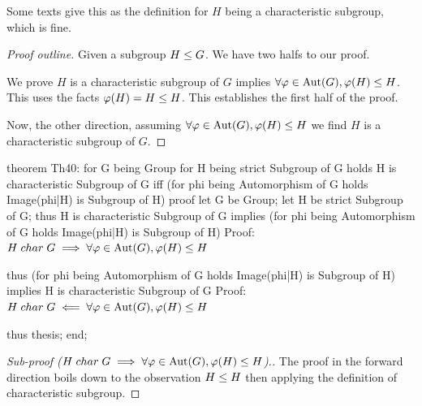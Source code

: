 Some texts give this as the definition for $H$ being a characteristic
subgroup, which is fine.

\begin{proof}[Proof outline]
  Given a subgroup $H\leq G$. We have two halfs to our proof.

We prove $H$ is a characteristic subgroup of $G$ implies
$\forall\varphi\in\operatorname{Aut}(G),\varphi(H)\leq H$. This uses the facts
$\varphi(H)=H\leq H$. This establishes the first half of the proof.

Now, the other direction, assuming
$\forall\varphi\in\operatorname{Aut}(G),\varphi(H)\leq H$ we find $H$ is a
characteristic subgroup of $G$.
\end{proof}

\nwenddocs{}\endmoddef\nwstartdeflinemarkup{}\nwenddeflinemarkup
theorem Th40:
  for G being Group
  for H being strict Subgroup of G
  holds H is characteristic Subgroup of G iff
  (for phi being Automorphism of G holds Image(phi|H) is Subgroup of H)
proof
  let G be Group;
  let H be strict Subgroup of G;
  thus H is characteristic Subgroup of G implies
       (for phi being Automorphism of G holds Image(phi|H) is Subgroup of H)
  \LA{}Proof: $H\mathrel{char} G\implies\forall\varphi\in\operatorname{Aut}(G),\varphi(H)\leq H$~{\nwtagstyle{}}\RA{}

  thus (for phi being Automorphism of G holds Image(phi|H) is Subgroup of H)
       implies H is characteristic Subgroup of G
  \LA{}Proof: $H\mathrel{char} G\impliedby\forall\varphi\in\operatorname{Aut}(G),\varphi(H)\leq H$~{\nwtagstyle{}}\RA{}

  thus thesis;
end;
\eatline
{}\nwendcode{}\nwdocspar
\begin{proof}[Sub-proof ($H\mathrel{char} G\implies\forall\varphi\in\operatorname{Aut}(G),\varphi(H)\leq H$).]
The proof in the forward direction boils down to the observation
$H\leq H$ then applying the definition of characteristic subgroup.
\end{proof}


